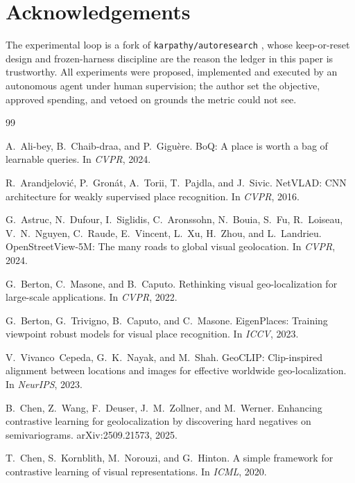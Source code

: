 \documentclass[11pt,a4paper]{article}
\begin{document}
\section*{Acknowledgements}

The experimental loop is a fork of \texttt{karpathy/autoresearch}
\cite{karpathy2026autoresearch}, whose keep-or-reset design and frozen-harness discipline are
the reason the ledger in this paper is trustworthy. All experiments were proposed, implemented
and executed by an autonomous agent under human supervision; the author set the objective,
approved spending, and vetoed on grounds the metric could not see.

\begin{thebibliography}{99}
\small

A.~Ali-bey, B.~Chaib-draa, and P.~Gigu\`ere.
\newblock BoQ: A place is worth a bag of learnable queries.
\newblock In \emph{CVPR}, 2024.

R.~Arandjelovi\'c, P.~Gron\'at, A.~Torii, T.~Pajdla, and J.~Sivic.
\newblock NetVLAD: CNN architecture for weakly supervised place recognition.
\newblock In \emph{CVPR}, 2016.

G.~Astruc, N.~Dufour, I.~Siglidis, C.~Aronssohn, N.~Bouia, S.~Fu, R.~Loiseau, V.~N.~Nguyen,
C.~Raude, E.~Vincent, L.~Xu, H.~Zhou, and L.~Landrieu.
\newblock OpenStreetView-5M: The many roads to global visual geolocation.
\newblock In \emph{CVPR}, 2024.

G.~Berton, C.~Masone, and B.~Caputo.
\newblock Rethinking visual geo-localization for large-scale applications.
\newblock In \emph{CVPR}, 2022.

G.~Berton, G.~Trivigno, B.~Caputo, and C.~Masone.
\newblock EigenPlaces: Training viewpoint robust models for visual place recognition.
\newblock In \emph{ICCV}, 2023.

V.~Vivanco~Cepeda, G.~K.~Nayak, and M.~Shah.
\newblock GeoCLIP: Clip-inspired alignment between locations and images for effective
worldwide geo-localization.
\newblock In \emph{NeurIPS}, 2023.

B.~Chen, Z.~Wang, F.~Deuser, J.~M.~Zollner, and M.~Werner.
\newblock Enhancing contrastive learning for geolocalization by discovering hard negatives
on semivariograms.
\newblock arXiv:2509.21573, 2025.

T.~Chen, S.~Kornblith, M.~Norouzi, and G.~Hinton.
\newblock A simple framework for contrastive learning of visual representations.
\newblock In \emph{ICML}, 2020.


\end{thebibliography}
\end{document}
